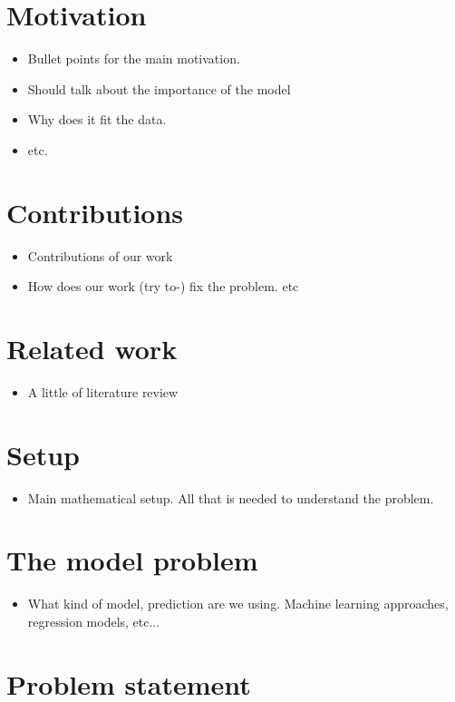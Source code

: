 \documentclass[11pt]{article}
\numberwithin{equation}{section}
\numberwithin{figure}{section}
\begin{document}
\section{Motivation}
\begin{itemize}
\item Bullet points for the main motivation.
\item Should talk about the importance of the model
\item Why does it fit the data.

\item etc.
\end{itemize}
\section{Contributions}
\begin{itemize}
\item Contributions of our work
\item How does our work  (try to-) fix the problem. etc
\end{itemize}
\section{Related work}

\begin{itemize}
\item A little of literature review
\end{itemize}
\section{Setup}

\begin{itemize}
\item Main mathematical setup. All that is needed to  understand the problem.
\end{itemize}
\section{The model problem}

\begin{itemize}
\item What kind of model, prediction are we using. Machine learning approaches, regression models, etc...
\end{itemize}
\section{Problem statement}
\end{document}
